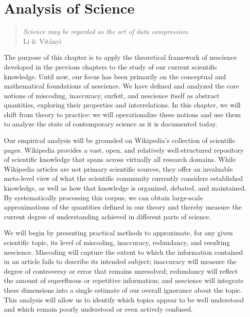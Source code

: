 %
%


\chapter{Analysis of Science}
\label{chap:philosophy-science}

\begin{quote}
\begin{flushright}
\emph{Science may be regarded as the art of data compression.}\\
Li \& Vitányi
\end{flushright}
\end{quote}
\bigskip

The purpose of this chapter is to apply the theoretical framework of nescience developed in the previous chapters to the study of our current scientific knowledge. Until now, our focus has been primarily on the conceptual and mathematical foundations of nescience. We have defined and analyzed the core notions of miscoding, inaccuracy, surfeit, and nescience itself as abstract quantities, exploring their properties and interrelations. In this chapter, we will shift from theory to practice: we will operationalize these notions and use them to analyze the state of contemporary science as it is documented today.

Our empirical analysis will be grounded on Wikipedia's collection of scientific pages. Wikipedia provides a vast, open, and relatively well-structured repository of scientific knowledge that spans across virtually all research domains. While Wikipedia articles are not primary scientific sources, they offer an invaluable meta-level view of what the scientific community currently considers established knowledge, as well as how that knowledge is organized, debated, and maintained. By systematically processing this corpus, we can obtain large-scale approximations of the quantities defined in our theory and thereby measure the current degree of understanding achieved in different parts of science.

We will begin by presenting practical methods to approximate, for any given scientific topic, its level of miscoding, inaccuracy, redundancy, and resulting nescience. Miscoding will capture the extent to which the information contained in an article fails to describe its intended subject; inaccuracy will measure the degree of controversy or error that remains unresolved; redundancy will reflect the amount of superfluous or repetitive information; and nescience will integrate these dimensions into a single estimate of our overall ignorance about the topic. This analysis will allow us to identify which topics appear to be well understood and which remain poorly understood or even actively confused.

